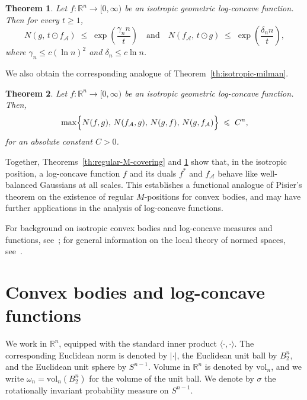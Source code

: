\documentclass[11pt,leqno]{article}
\newtheorem{theorem}{Theorem}[section]
\theoremstyle{definition}
\theoremstyle{remark}
\numberwithin{equation}{section}
\newcommand{\vol}{\mathrm{vol}}
\newcommand{\ls}{\leqslant}
\newcommand{\gr}{\geqslant}
\begin{document}
\begin{theorem}\label{th:regular-airy}
Let $f:\mathbb{R}^{n}\to[0,\infty)$ be an isotropic geometric log-concave function.
Then for every $t\gr 1$,
$$N(g,\, t\odot f_{\mathcal{A}})\;\ls\;\exp\!\left( \frac{\gamma_{n} n}{t} \right)
\quad \text{and} \quad  
N(f_{\mathcal{A}},\, t\odot g)\;\ls\;\exp\!\left( \frac{\delta_{n} n}{t} \right),$$
where $\gamma_{n} \ls c(\ln n)^{2}$ and $\delta_n\ls c\ln n$.
\end{theorem}

We also obtain the corresponding analogue of Theorem~\ref{th:isotropic-milman}.

\begin{theorem}\label{th:isotropic-milman-dual}
Let $f:\mathbb{R}^{n}\to[0,\infty)$ be an isotropic geometric log-concave function.
Then,
$$\max\Bigl\{N(f,g),\, N(f_{\mathcal{A}},g),\, N(g,f),\, N(g,f_{\mathcal{A}})\Bigr\} \;\ls\; C^{n},$$
for an absolute constant $C>0$.
\end{theorem}


Together, Theorems~\ref{th:regular-M-covering} and \ref{th:regular-airy} show that, in the isotropic position, 
a log-concave function $f$ and its duals $f^{\ast}$ and $f_{\mathcal{A}}$ behave like well-balanced 
Gaussians at all scales.  
This establishes a functional analogue of Pisier's theorem on the existence of regular $M$-positions for convex bodies, 
and may have further applications in the analysis of log-concave functions.

\smallskip

For background on isotropic convex bodies and log-concave measures and functions, see~\cite{BGVV-book};  
for general information on the local theory of normed spaces, see~\cite{AGA-book, AGA-book-2, Pisier-book}.




\section{Convex bodies and log-concave functions}\label{section:2}

We work in $\mathbb{R}^n$, equipped with the standard inner product $\langle \cdot, \cdot \rangle$.  
The corresponding Euclidean norm is denoted by $|\cdot|$, the Euclidean unit ball by $B_2^n$, and the Euclidean unit sphere by $S^{n-1}$.  
Volume in $\mathbb{R}^n$ is denoted by $\vol_n$, and we write $\omega_n = \vol_n(B_2^n)$ for the volume of the unit ball.
We denote by $\sigma$ the rotationally invariant probability measure on $S^{n-1}$.
\end{document}
